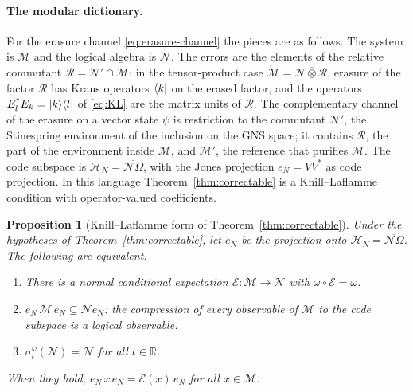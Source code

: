 \documentclass[a4paper,11pt]{article}
\newtheorem{proposition}[theorem]{Proposition}
\theoremstyle{definition}
\newcommand{\mE}{\mathcal{E}}
\begin{document}
\paragraph{The modular dictionary.}
For the erasure channel \eqref{eq:erasure-channel} the pieces are as follows. The system is $\mathcal M$ and the logical algebra is $\mathcal N$. The errors are the elements of the relative commutant $\mathcal R=\mathcal N'\cap\mathcal M$: in the tensor-product case $\mathcal M=\mathcal N\overline\otimes\mathcal R$, erasure of the factor $\mathcal R$ has Kraus operators $\bra{k}$ on the erased factor, and the operators $E_l^\dagger E_k=\ket{k}\!\bra{l}$ of \eqref{eq:KL} are the matrix units of $\mathcal R$. The complementary channel of the erasure on a vector state $\psi$ is restriction to the commutant $\mathcal N'$, the Stinespring environment of the inclusion on the GNS space; it contains $\mathcal R$, the part of the environment inside $\mathcal M$, and $\mathcal M'$, the reference that purifies $\mathcal M$. The code subspace is $\mathcal H_N=\overline{\mathcal N\Omega}$, with the Jones projection $e_N=VV^*$ as code projection. In this language Theorem~\ref{thm:correctable} is a Knill--Laflamme condition with operator-valued coefficients.

\begin{proposition}[Knill--Laflamme form of Theorem~\ref{thm:correctable}]\label{prop:KL}
Under the hypotheses of Theorem~\ref{thm:correctable}, let $e_N$ be the projection onto $\mathcal H_N=\overline{\mathcal N\Omega}$. The following are equivalent.
\begin{enumerate}
 \item[\rm(i)] There is a normal conditional expectation $\mE:\mathcal M\to\mathcal N$ with $\omega\circ\mE=\omega$.
 \item[\rm(ii)] $e_N\,\mathcal M\,e_N\subseteq\mathcal N e_N$: the compression of every observable of $\mathcal M$ to the code subspace is a logical observable.
 \item[\rm(iii)] $\sigma^\omega_t(\mathcal N)=\mathcal N$ for all $t\in\mathbb R$.
\end{enumerate}
When they hold, $e_N\,x\,e_N=\mE(x)\,e_N$ for all $x\in\mathcal M$.
\end{proposition}
\end{document}

